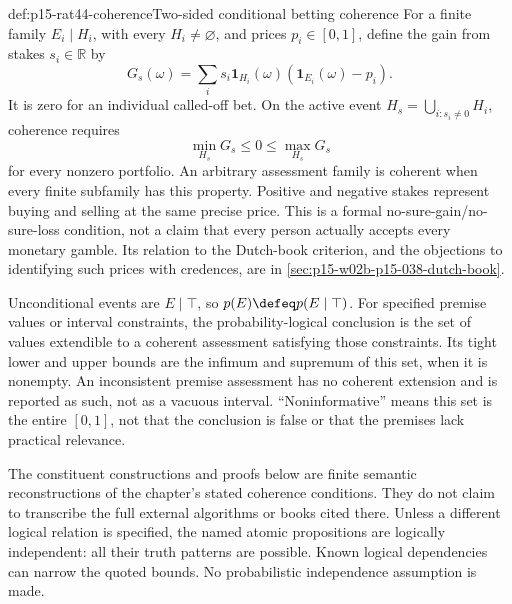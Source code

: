 \begin{hbdefinition}{def:p15-rat44-coherence}{Two-sided conditional betting coherence}
For a finite family \(E_i\mid H_i\), with every \(H_i\ne\varnothing\),
and prices \(p_i\in[0,1]\), define the gain from stakes \(s_i\in\mathbb R\)
by
\[
 G_s(\omega)=\sum_i s_i\mathbf1_{H_i}(\omega)
                            (\mathbf1_{E_i}(\omega)-p_i).
\]
It is zero for an individual called-off bet. On the active event
\(H_s=\bigcup_{i:s_i\ne0}H_i\), coherence requires
\[
             \min_{H_s}G_s\leq0\leq\max_{H_s}G_s
\]
for every nonzero portfolio. An arbitrary assessment family is coherent
when every finite subfamily has this property. Positive and negative
stakes represent buying and selling at the same precise price. This is
a formal no-sure-gain/no-sure-loss condition, not a claim that every
person actually accepts every monetary gamble. Its relation to the
Dutch-book criterion, and the objections to identifying such prices
with credences, are in \cref{sec:p15-w02b-p15-038-dutch-book}.

Unconditional events are \(E\mid\top\), so
\(p(E)\defeq p(E\mid\top)\). For specified premise values or
interval constraints, the probability-logical conclusion is the set of
values extendible to a coherent assessment satisfying those constraints.
Its tight lower and upper bounds are the infimum and supremum of this
set, when it is nonempty. An inconsistent premise assessment has no
coherent extension and is reported as such, not as a vacuous interval.
``Noninformative'' means this set is the entire \([0,1]\), not
that the conclusion is false or that the premises lack practical relevance.
\end{hbdefinition}

The constituent constructions and proofs below are finite semantic
reconstructions of the chapter's stated coherence conditions. They do
not claim to transcribe the full external algorithms or books cited
there. Unless a different logical relation is specified, the named
atomic propositions are logically independent: all their truth patterns
are possible. Known logical dependencies can narrow the quoted bounds.
No probabilistic independence assumption is made.


